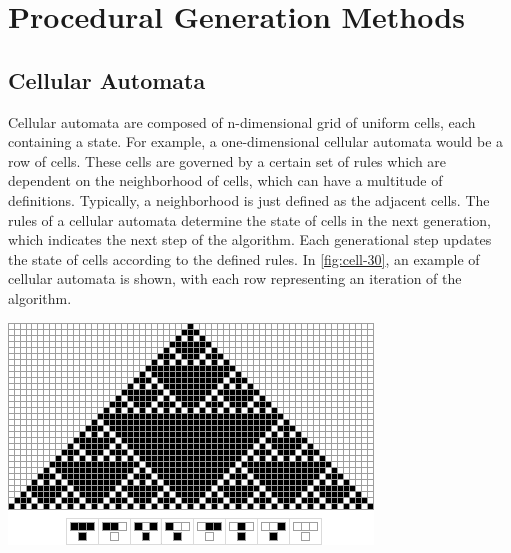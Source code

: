 \documentclass[10pt]{report}
\begin{document}

	\vspace{10pt}
	\let\clearpage\relax
	\chapter{Procedural Generation Methods}
		\section{Cellular Automata}
			Cellular automata are composed of n-dimensional grid of uniform cells, each containing a state. For example, a one-dimensional cellular automata would be a row of cells. These cells are governed by a certain set of rules which are dependent on the neighborhood of cells, which can have a multitude of definitions. Typically, a neighborhood is just defined as the adjacent cells. The rules of a cellular automata determine the state of cells in the next generation, which indicates the next step of the algorithm. Each generational step updates the state of cells according to the defined rules. In \autoref{fig:cell-30}, an example of cellular automata is shown, with each row representing an iteration of the algorithm.
			
			\begin{minipage}{\textwidth}
				\centering
				\includegraphics[scale=0.8]{rule-30}
				\label{fig:cell-30}
			\end{minipage}
		
\end{document}
